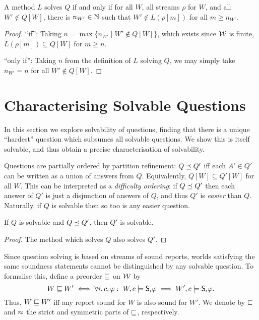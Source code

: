 \begin{proposition}
    \label{tt_prop_elimination_solving}
    A method $L$ solves $Q$ if and only if for all $W$, all streams $\rho$ for
    $W$, and all $W' \notin Q[W]$, there is $n_{W'} \in \mathbb{N}$ such that $W'
    \notin L(\rho[m])$ for all $m \ge n_{W'}$.
\end{proposition}

\begin{proof}
    ``if'': Taking $n = \max\{n_{W'} \mid W' \notin Q[W]\}$, which exists
    since $\mathcal{W}$ is finite, $L(\rho[m]) \subseteq Q[W]$ for $m \ge
    n$.

    ``only if'': Taking $n$ from the definition of $L$ solving $Q$, we may
    simply take $n_{W'} = n$ for all $W' \notin Q[W]$.
\end{proof}

\section{Characterising Solvable Questions}
\label{tt_sec_characterising_solvable_questions}

In this section we explore solvability of questions, finding that there is a
unique ``hardest'' question which subsumes all solvable questions. We show this
is itself solvable, and thus obtain a precise characterisation of solvability.

Questions are partially ordered by partition refinement: $Q \preceq Q'$ iff
each $A' \in Q'$ can be written as a union of answers from $Q$. Equivalently,
$Q[W] \subseteq Q'[W]$ for all $W$. This can be interpreted as a
\emph{difficulty ordering}: if $Q \preceq Q'$ then each answer of $Q'$ is just
a disjunction of answers of $Q$, and thus $Q'$ is \emph{easier} than $Q$.
Naturally, if $Q$ is solvable then so too is any easier question.

\begin{proposition}
    \label{tt_prop_easier_questions_also_solvable}
    If $Q$ is solvable and $Q \preceq Q'$, then $Q'$ is solvable.
\end{proposition}
\begin{proof}
    The method which solves $Q$ also solves $Q'$.
\end{proof}

Since question solving is based on streams of sound reports, worlds satisfying
the same soundness statements cannot be distinguished by any solvable question.
To formalise this, define a preorder $\sqsubseteq$ on $\mathcal{W}$ by
\[
    W \sqsubseteq W'
    \iff
    \forall i, c, \varphi:\
        W, c \models \mathsf{S}_i\varphi \implies W', c \models \mathsf{S}_i\varphi.
\]
Thus, $W \sqsubseteq W'$ iff any report sound for $W$ is also sound for $W'$. We
denote by $\sqsubset$ and $\approx$ the strict and symmetric parts of $\sqsubseteq$,
respectively.\footnotemark{}


